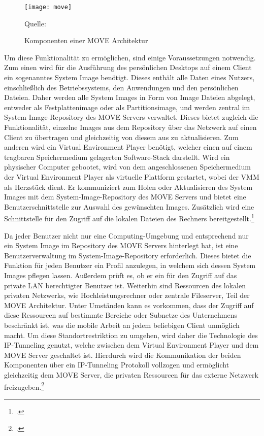 \begin{figure}[H]
\begin{center}
\texttt{[image: move]}
\caption{Komponenten einer MOVE Architektur}
Quelle: \cite[Seite 891]{MOVE}
\end{center}
\end{figure}
\vspace{-1cm}

Um diese Funktionalität zu ermöglichen, sind einige Voraussetzungen notwendig. Zum einen wird für die Ausführung des persönlichen Desktops auf einem Client ein sogenanntes System Image benötigt. Dieses enthält alle Daten eines Nutzers, einschließlich des Betriebssystems, den Anwendungen und den persönlichen Dateien.
Daher werden alle System Images in Form von Image Dateien abgelegt, entweder als Festplattenimage oder als Partitionsimage, und werden zentral im System-Image-Repository des MOVE Servers verwaltet. Dieses bietet zugleich die Funktionalität, einzelne Images aus dem Repository über das Netzwerk auf einen Client zu übertragen und gleichzeitig von diesem aus zu aktualisieren. Zum anderen wird ein Virtual Environment Player benötigt, welcher einen auf einem tragbaren Speichermedium gelagerten Software-Stack darstellt. Wird ein physischer Computer gebootet, wird von dem angeschlossenen Speichermedium der Virtual Environment Player als virtuelle Plattform gestartet, wobei der VMM als Herzstück dient. Er kommuniziert zum Holen oder Aktualisieren des System Images mit dem System-Image-Repository des MOVE Servers und bietet eine Benutzerschnittstelle zur Auswahl des gewünschten Images. Zusätzlich wird eine Schnittstelle für den Zugriff auf die lokalen Dateien des Rechners bereitgestellt.\footcite[Vgl.][Seite 892]{MOVE}

Da jeder Benutzer nicht nur eine Computing-Umgebung und entsprechend nur ein System Image im Repository des MOVE Servers hinterlegt hat, ist eine Benutzerverwaltung im System-Image-Repository erforderlich. Dieses bietet die Funktion für jeden Benutzer ein Profil anzulegen, in welchem sich dessen System Images pflegen lassen. Außerdem prüft es, ob er ein für den Zugriff auf das private LAN berechtigter Benutzer ist. Weiterhin sind Ressourcen des lokalen privaten Netzwerks, wie Hochleistungsrechner oder zentrale Fileserver, Teil der MOVE Architektur. Unter Umständen kann es vorkommen, dass der Zugriff auf diese Ressourcen auf bestimmte Bereiche oder Subnetze des Unternehmens beschränkt ist, was die mobile Arbeit an jedem beliebigen Client unmöglich macht. Um diese Standortrestriktion zu umgehen, wird daher die Technologie des IP-Tunneling genutzt, welche zwischen dem Virtual Environment Player und dem MOVE Server geschaltet ist. Hierdurch wird die Kommunikation der beiden Komponenten über ein IP-Tunneling Protokoll vollzogen und ermöglicht gleichzeitig dem MOVE Server, die privaten Ressourcen für das externe Netzwerk freizugeben.\footcite[Vgl.][Seite 892]{MOVE}

